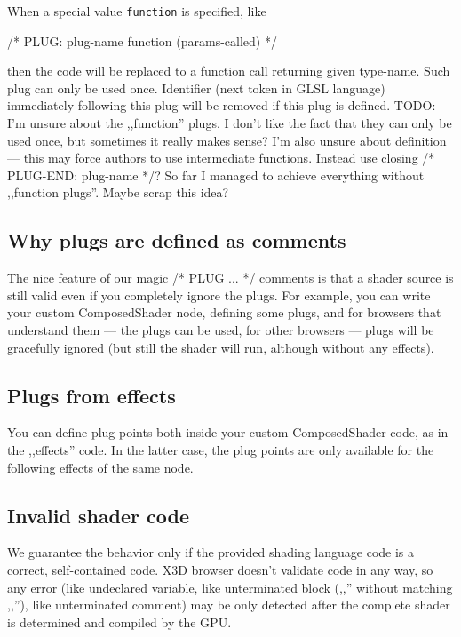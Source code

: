 \documentclass{acmsiggraph}                     %
\newenvironment{mycode}
{\begin{mycodecore}}
{\end{mycodecore}
\vspace{-0.1in}}
\begin{document}
When a special value \texttt{function} is specified, like

\begin{mycode}
/* PLUG: plug-name function (params-called) */
\end{mycode}

then the code will be replaced to a function call returning given type-name.
Such plug can only be used once.
Identifier (next token in GLSL language) immediately following
this plug will be removed if this plug is defined.
TODO: I'm unsure about the ,,function'' plugs.
I don't like the fact that they can only be used once, but sometimes
it really makes sense?
I'm also unsure about definition --- this may force authors to use
intermediate functions. Instead use closing /* PLUG-END: plug-name */?
So far I managed to achieve everything without ,,function plugs''.
Maybe scrap this idea?

\subsection{Why plugs are defined as comments}

The nice feature of our magic /* PLUG ... */ comments is that a shader source
is still valid even if you completely ignore the plugs. For example,
you can write your custom ComposedShader node, defining some plugs,
and for browsers that understand them --- the plugs can be used,
for other browsers --- plugs will be gracefully ignored (but still
the shader will run, although without any effects).

\subsection{Plugs from effects}

You can define plug points both inside your custom ComposedShader code,
as in the ,,effects'' code. In the latter case, the plug points
are only available for the following effects of the same node.

\subsection{Invalid shader code}

We guarantee the behavior only if the provided shading language code
is a correct, self-contained code.
X3D browser doesn't validate code in any way, so any error (like undeclared
variable, like unterminated block (,,{'' without matching ,,}''),
like unterminated comment) may be only detected after the complete shader
is determined and compiled by the GPU.
\end{document}
